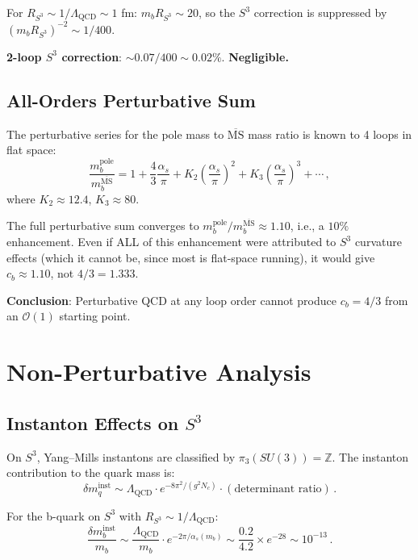 \documentclass[11pt,a4paper]{article}
\begin{document}
For $R_{S^3} \sim 1/\Lambda_{\mathrm{QCD}} \sim 1$ fm: $m_b R_{S^3} \sim 20$, so the $S^3$ correction is suppressed by $(m_b R_{S^3})^{-2} \sim 1/400$.

\textbf{2-loop $S^3$ correction}: $\sim 0.07/400 \sim 0.02\%$. \textbf{Negligible.}

\subsection{All-Orders Perturbative Sum}

The perturbative series for the pole mass to $\overline{\mathrm{MS}}$ mass ratio is known to 4 loops in flat space:
\begin{equation}
\frac{m_b^{\mathrm{pole}}}{m_b^{\overline{\mathrm{MS}}}} = 1 + \frac{4}{3}\frac{\alpha_s}{\pi} + K_2\left(\frac{\alpha_s}{\pi}\right)^2 + K_3\left(\frac{\alpha_s}{\pi}\right)^3 + \cdots\,,
\end{equation}
where $K_2 \approx 12.4$, $K_3 \approx 80$.

The full perturbative sum converges to $m_b^{\mathrm{pole}}/m_b^{\overline{\mathrm{MS}}} \approx 1.10$, i.e., a $10\%$ enhancement. Even if ALL of this enhancement were attributed to $S^3$ curvature effects (which it cannot be, since most is flat-space running), it would give $c_b \approx 1.10$, not $4/3 = 1.333$.

\textbf{Conclusion}: Perturbative QCD at any loop order cannot produce $c_b = 4/3$ from an $\mathcal{O}(1)$ starting point.

\section{Non-Perturbative Analysis}

\subsection{Instanton Effects on $S^3$}

On $S^3$, Yang--Mills instantons are classified by $\pi_3(SU(3)) = \mathbb{Z}$. The instanton contribution to the quark mass is:
\begin{equation}
\delta m_q^{\mathrm{inst}} \sim \Lambda_{\mathrm{QCD}} \cdot e^{-8\pi^2/(g^2 N_c)} \cdot (\text{determinant ratio})\,.
\end{equation}

For the b-quark on $S^3$ with $R_{S^3} \sim 1/\Lambda_{\mathrm{QCD}}$:
\begin{equation}
\frac{\delta m_b^{\mathrm{inst}}}{m_b} \sim \frac{\Lambda_{\mathrm{QCD}}}{m_b} \cdot e^{-2\pi/\alpha_s(m_b)} \sim \frac{0.2}{4.2} \times e^{-28} \sim 10^{-13}\,.
\end{equation}
\end{document}
